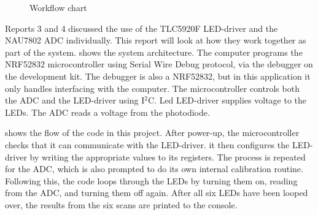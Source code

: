 \documentclass[12pt, a4paper]{article}
\begin{document}
        \begin{figure}
            \centering
            \vspace{-40pt}
            \caption{Workflow chart}
            \label{fig:workflow}
        \end{figure}

        Reports 3 and 4 discussed the use of the TLC5920F LED-driver and the NAU7802 ADC individually. This report will look at how they work together
        as part of the system.  shows the system architecture. The computer programs the NRF52832 microcontroller
        using Serial Wire Debug protocol, via the debugger on the development kit. The debugger is also a NRF52832, but in this application it only handles
        interfacing with the computer. The microcontroller controls both the ADC and the LED-driver using I$^2$C.
        Led LED-driver supplies voltage to the LEDs.  The ADC reads a voltage from the photodiode.

         shows the flow of the code in this project. After power-up, the microcontroller checks that it can communicate with the LED-driver.
        it then configures the LED-driver by writing the appropriate values to its registers. The process is repeated for the ADC, which is also
        prompted to do its own internal calibration routine. Following this, the code loops through the LEDs by turning them on, reading from
        the ADC, and turning them off again. After all six LEDs have been looped over, the results from the six scans are printed to the console.
\end{document}
